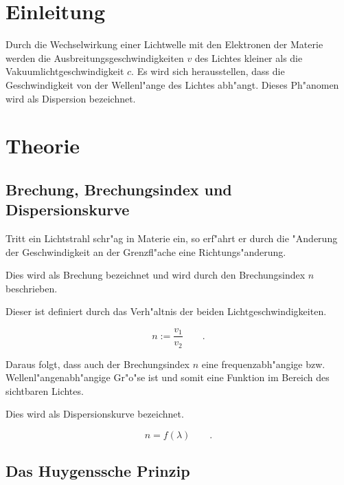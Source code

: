 \section{Einleitung} %
\label{sec:einleitung}

	Durch die Wechselwirkung einer Lichtwelle mit den Elektronen der Materie werden die Ausbreitungsgeschwindigkeiten $v$ des Lichtes kleiner als die Vakuumlichtgeschwindigkeit $c$.
	Es wird sich herausstellen, dass die Geschwindigkeit von der Wellenl"ange des Lichtes abh"angt. Dieses Ph"anomen wird als Dispersion bezeichnet.
	
\section{Theorie} %
\label{sec:theorie}

	\subsection{Brechung, Brechungsindex und Dispersionskurve} %
	\label{sub:brechungsindex}
	
	Tritt ein Lichtstrahl schr"ag in Materie ein, so erf"ahrt er durch die "Anderung der Geschwindigkeit an der Grenzfl"ache eine Richtungs"anderung.

	Dies wird als Brechung bezeichnet und wird durch den Brechungsindex $n$ beschrieben.

	Dieser ist definiert durch das Verh"altnis der beiden Lichtgeschwindigkeiten.

	\begin{equation}
		n := \frac{v_\mathrm{1}}{v_\mathrm{2}} \qquad . \label{gl:brechung}
	\end{equation}

	Daraus folgt, dass auch der Brechungsindex $n$ eine frequenzabh"angige bzw. Wellenl"angenabh"angige Gr"o"se ist und somit eine Funktion im Bereich des sichtbaren Lichtes.

	Dies wird als Dispersionskurve bezeichnet.

	\begin{equation}
		n = f(\lambda) \qquad .
	\end{equation}

	\subsection{Das Huygenssche Prinzip} %
	\label{sub:das_huygenssche_prinzip}
	
